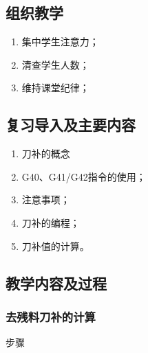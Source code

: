 \jxhj{%
	}

\makeshouye %

\subsection{组织教学}
\begin{enumerate}[\hspace{2em}1、]
	\item 集中学生注意力；
	\item 清查学生人数；
	\item 维持课堂纪律；
\end{enumerate}
\subsection{复习导入及主要内容}
\begin{enumerate}[1、]
\item 刀补的概念
\item G40、G41/G42指令的使用；
\item 注意事项；
\item 刀补的编程；
\item 刀补值的计算。
\end{enumerate}



\subsection{教学内容及过程}

\subsubsection{去残料刀补的计算}
步骤

